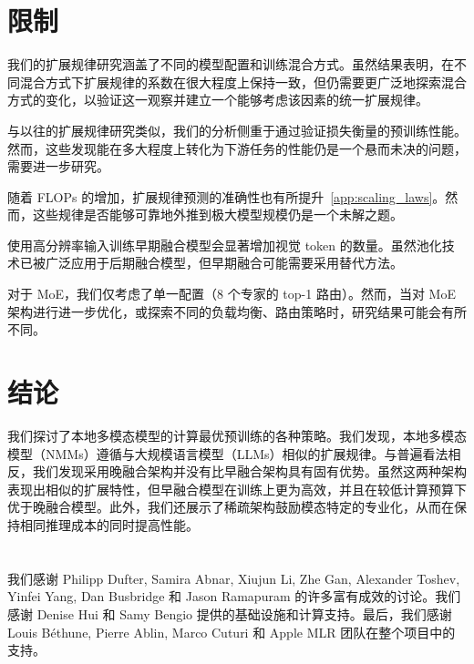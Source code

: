 \section{限制}

我们的扩展规律研究涵盖了不同的模型配置和训练混合方式。虽然结果表明，在不同混合方式下扩展规律的系数在很大程度上保持一致，但仍需要更广泛地探索混合方式的变化，以验证这一观察并建立一个能够考虑该因素的统一扩展规律。

与以往的扩展规律研究类似，我们的分析侧重于通过验证损失衡量的预训练性能。然而，这些发现能在多大程度上转化为下游任务的性能仍是一个悬而未决的问题，需要进一步研究。

随着 FLOPs 的增加，扩展规律预测的准确性也有所提升~\cref{app:scaling_laws}。然而，这些规律是否能够可靠地外推到极大模型规模仍是一个未解之题。

使用高分辨率输入训练早期融合模型会显著增加视觉 token 的数量。虽然池化技术已被广泛应用于后期融合模型，但早期融合可能需要采用替代方法。

对于 MoE，我们仅考虑了单一配置（8 个专家的 top-1 路由）。然而，当对 MoE 架构进行进一步优化，或探索不同的负载均衡、路由策略时，研究结果可能会有所不同。
\section{结论}
我们探讨了本地多模态模型的计算最优预训练的各种策略。我们发现，本地多模态模型（NMMs）遵循与大规模语言模型（LLMs）相似的扩展规律。与普遍看法相反，我们发现采用晚融合架构并没有比早融合架构具有固有优势。虽然这两种架构表现出相似的扩展特性，但早融合模型在训练上更为高效，并且在较低计算预算下优于晚融合模型。此外，我们还展示了稀疏架构鼓励模态特定的专业化，从而在保持相同推理成本的同时提高性能。
\section*{} 我们感谢 Philipp Dufter, Samira Abnar, Xiujun Li, Zhe Gan, Alexander Toshev, Yinfei Yang, Dan Busbridge 和 Jason Ramapuram 的许多富有成效的讨论。我们感谢 Denise Hui 和 Samy Bengio 提供的基础设施和计算支持。最后，我们感谢 Louis Béthune, Pierre Ablin, Marco Cuturi 和 Apple MLR 团队在整个项目中的支持。
